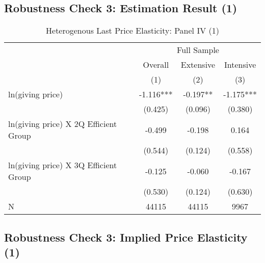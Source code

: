 \documentclass[ review  , 3p ]{elsarticle}
\begin{document}
  \hypertarget{robustness-check-3-estimation-result-1}{%
  \subsection{Robustness Check 3: Estimation Result (1)}\label{robustness-check-3-estimation-result-1}}
  
  \begin{table}
  
  \caption{\label{tab:kableHeteroShortElasticitySlide1}Heterogenous Last Price Elasticity: Panel IV (1)}
  \centering
  \fontsize{8}{10}\selectfont
  \begin{tabular}[t]{lccc}
  \toprule
  \multicolumn{1}{c}{ } & \multicolumn{3}{c}{Full Sample} \\
  \cmidrule(l{3pt}r{3pt}){2-4}
  \multicolumn{1}{c}{ } & \multicolumn{1}{c}{Overall} & \multicolumn{1}{c}{Extensive} & \multicolumn{1}{c}{Intensive} \\
  \cmidrule(l{3pt}r{3pt}){2-2} \cmidrule(l{3pt}r{3pt}){3-3} \cmidrule(l{3pt}r{3pt}){4-4}
   & (1) & (2) & (3)\\
  \midrule
  ln(giving price) & -1.116*** & -0.197** & -1.175***\\
   & (0.425) & (0.096) & (0.380)\\
  ln(giving price) X 2Q Efficient Group & -0.499 & -0.198 & 0.164\\
   & (0.544) & (0.124) & (0.558)\\
  ln(giving price) X 3Q Efficient Group & -0.125 & -0.060 & -0.167\\
   & (0.530) & (0.124) & (0.630)\\
  N & 44115 & 44115 & 9967\\
  \bottomrule
  \end{tabular}
  \end{table}
  
  \hypertarget{robustness-check-3-implied-price-elasticity-1}{%
  \subsection{Robustness Check 3: Implied Price Elasticity (1)}\label{robustness-check-3-implied-price-elasticity-1}}
  
\end{document}
